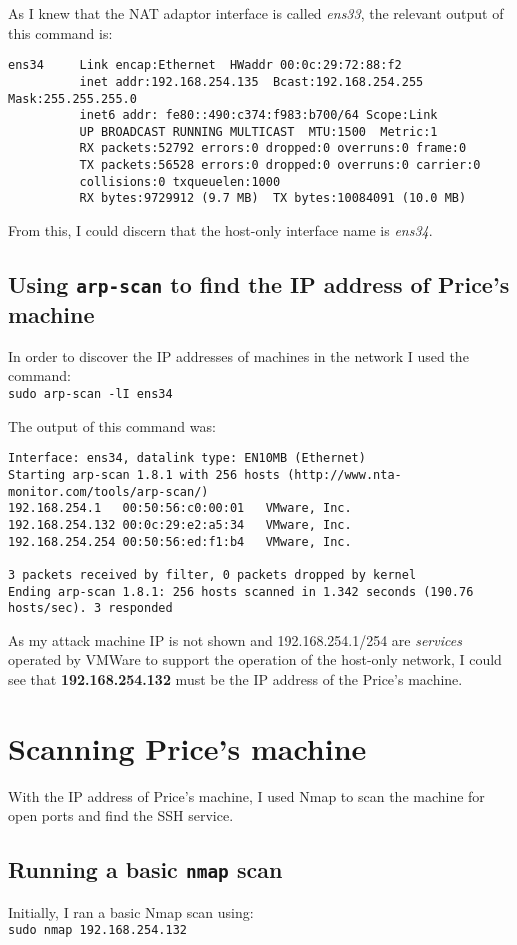 \documentclass[12pt]{report}
\newcommand{\term}[1]{\colorbox{light-gray}{\texttt{#1}}}
\begin{document}
As I knew that the NAT adaptor interface is called \textit{ens33}, the relevant output of this command is:
\begin{Verbatim}[frame=leftline]
ens34     Link encap:Ethernet  HWaddr 00:0c:29:72:88:f2
          inet addr:192.168.254.135  Bcast:192.168.254.255  Mask:255.255.255.0
          inet6 addr: fe80::490:c374:f983:b700/64 Scope:Link
          UP BROADCAST RUNNING MULTICAST  MTU:1500  Metric:1
          RX packets:52792 errors:0 dropped:0 overruns:0 frame:0
          TX packets:56528 errors:0 dropped:0 overruns:0 carrier:0
          collisions:0 txqueuelen:1000
          RX bytes:9729912 (9.7 MB)  TX bytes:10084091 (10.0 MB)
\end{Verbatim}

From this, I could discern that the host-only interface name is \textit{ens34}.

\subsection{Using \texttt{arp-scan} to find the IP address of Price's machine}
In order to discover the IP addresses of machines in the network I used the command:\\
\term{sudo arp-scan -lI ens34}

The output of this command was:
\begin{Verbatim}[frame=leftline, fontsize=\small]
Interface: ens34, datalink type: EN10MB (Ethernet)
Starting arp-scan 1.8.1 with 256 hosts (http://www.nta-monitor.com/tools/arp-scan/)
192.168.254.1	00:50:56:c0:00:01	VMware, Inc.
192.168.254.132	00:0c:29:e2:a5:34	VMware, Inc.
192.168.254.254	00:50:56:ed:f1:b4	VMware, Inc.

3 packets received by filter, 0 packets dropped by kernel
Ending arp-scan 1.8.1: 256 hosts scanned in 1.342 seconds (190.76 hosts/sec). 3 responded
\end{Verbatim}

As my attack machine IP is not shown and 192.168.254.1/254 are \textit{services} operated by VMWare to support the operation of the host-only network, I could see that \textbf{192.168.254.132} must be the IP address of the Price's machine.


\section{Scanning Price's machine}
With the IP address of Price's machine, I used Nmap to scan the machine for open ports and find the SSH service.
\subsection{Running a basic \texttt{nmap} scan}
Initially, I ran a basic Nmap scan using:\\
\term{sudo nmap 192.168.254.132}
\end{document}
